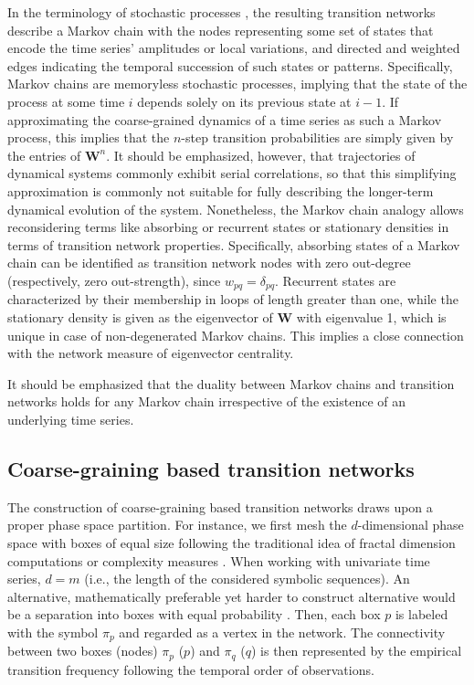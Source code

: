 In the terminology of stochastic processes \cite{Nicolis2005}, the resulting transition networks describe a Markov chain with the nodes representing some set of states that encode the time series' amplitudes or local variations, and directed and weighted edges indicating the temporal succession of such states or patterns. Specifically, Markov chains are memoryless stochastic processes, implying that the state of the process at some time $i$ depends solely on its previous state at $i-1$. If approximating the coarse-grained dynamics of a time series as such a Markov process, this implies that the $n$-step transition probabilities are simply given by the entries of $\mathbf{W}^n$. It should be emphasized, however, that trajectories of dynamical systems commonly exhibit serial correlations, so that this simplifying approximation is commonly not suitable for fully describing the longer-term dynamical evolution of the system. Nonetheless, the Markov chain analogy allows reconsidering terms like absorbing or recurrent states or stationary densities in terms of transition network properties. Specifically, absorbing states of a Markov chain can be identified as transition network nodes with zero out-degree (respectively, zero out-strength), since $w_{pq}=\delta_{pq}$. Recurrent states are characterized by their membership in loops of length greater than one, while the stationary density is given as the eigenvector of $\mathbf{W}$ with eigenvalue 1, which is unique in case of non-degenerated Markov chains. This implies a close connection with the network measure of eigenvector centrality.

It should be emphasized that the duality between Markov chains and transition networks holds for any Markov chain irrespective of the existence of an underlying time series.


	\subsection{Coarse-graining based transition networks}\label{sec:cgtn}

	The construction of coarse-graining based transition networks draws upon a proper phase space partition. For instance, we first mesh the $d$-dimensional phase space with boxes of equal size following the traditional idea of fractal dimension computations \cite{Grassberger1983PRL,Grassberger1983PLA} or complexity measures \cite{Crutchfield1989}. When working with univariate time series, $d=m$ (i.e., the length of the considered symbolic sequences). An alternative, mathematically preferable yet harder to construct alternative would be a separation into boxes with equal probability \cite{Liu2016}. Then, each box $p$ is labeled with the symbol $\pi_p$ and regarded as a vertex in the network. The connectivity between two boxes (nodes) $\pi_p$ ($p$) and $\pi_q$ ($q$) is then represented by the empirical transition frequency following the temporal order of observations. 

